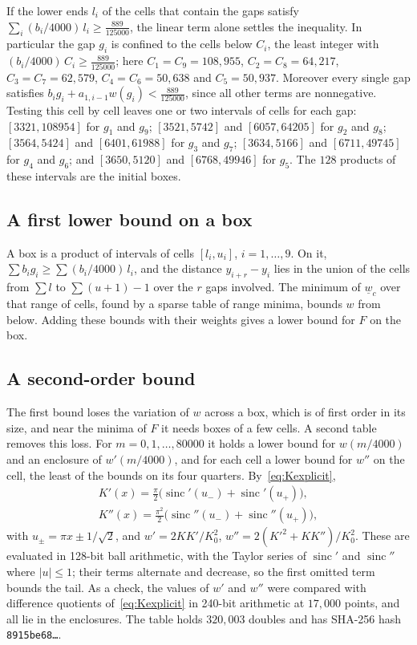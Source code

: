 \documentclass[aps,prd,twocolumn,superscriptaddress,nofootinbib,longbibliography,floatfix,showkeys,amsmath,amssymb,10pt]{revtex4-2}
\theoremstyle{definition}
\theoremstyle{remark}
\newcommand{\sinc}{\operatorname{sinc}}
\begin{document}
If the lower ends $l_i$ of the cells that contain the gaps satisfy
$\sum_i(b_i/4000)\,l_i\ge\frac{889}{125000}$, the linear term alone settles the
inequality. In particular the gap $g_i$ is confined to the cells below
$C_i$, the least integer with $(b_i/4000)\,C_i\ge\frac{889}{125000}$; here
$C_1=C_9=108{,}955$, $C_2=C_8=64{,}217$, $C_3=C_7=62{,}579$,
$C_4=C_6=50{,}638$ and $C_5=50{,}937$. Moreover every single gap satisfies
$b_ig_i+a_{1,i-1}w(g_i)<\frac{889}{125000}$, since all other terms are
nonnegative. Testing this cell by cell leaves one or two intervals of cells
for each gap: $[3321,108954]$ for $g_1$ and $g_9$; $[3521,5742]$ and
$[6057,64205]$ for $g_2$ and $g_8$; $[3564,5424]$ and $[6401,61988]$ for
$g_3$ and $g_7$; $[3634,5166]$ and $[6711,49745]$ for $g_4$ and $g_6$; and
$[3650,5120]$ and $[6768,49946]$ for $g_5$.
The $128$ products of these intervals are the initial boxes.

\subsection{A first lower bound on a box}

A box is a product of intervals of cells $[l_i,u_i]$, $i=1,\dots,9$. On it,
$\sum b_ig_i\ge\sum(b_i/4000)\,l_i$, and the distance $y_{i+r}-y_i$ lies
in the union of the cells from $\sum l$ to $\sum(u+1)-1$ over the $r$ gaps
involved. The minimum of $\underline w_c$ over that range of cells, found by
a sparse table of range minima, bounds $w$ from below. Adding these bounds
with their weights gives a lower bound for $F$ on the box.

\subsection{A second-order bound}

The first bound loses the variation of $w$ across a box, which is of first
order in its size, and near the minima of $F$ it needs boxes of a few
cells. A second table removes this loss. For $m=0,1,\dots,80000$ it holds a
lower bound for $w(m/4000)$ and an enclosure of $w'(m/4000)$, and for each
cell a lower bound for $w''$ on the cell, the least of the bounds on its
four quarters. By~\eqref{eq:Kexplicit},
\begin{gather*}
 K'(x)=\frac\pi2\bigl(\sinc'(u_-)+\sinc'(u_+)\bigr),\\
 K''(x)=\frac{\pi^2}2\bigl(\sinc''(u_-)+\sinc''(u_+)\bigr),
\end{gather*}
with $u_\pm=\pi x\pm1/\sqrt2$, and $w'=2KK'/K_0^2$,
$w''=2(K'^2+KK'')/K_0^2$. These are evaluated in 128-bit ball arithmetic,
with the Taylor series of $\sinc'$ and $\sinc''$ where $|u|\le1$; their
terms alternate and decrease, so the first omitted term bounds the
tail. As a check, the values of $w'$ and $w''$ were compared with
difference quotients of~\eqref{eq:Kexplicit} in 240-bit arithmetic at
$17{,}000$ points, and all lie in the enclosures. The table holds
$320{,}003$ doubles and has SHA-256 hash \texttt{8915be68\ldots}.
\end{document}
